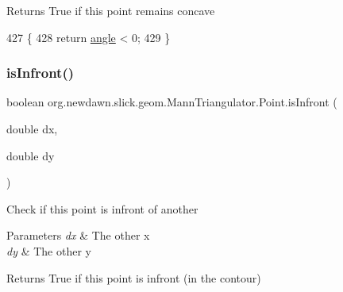 \begin{DoxyReturn}{Returns}
True if this point remains concave 
\end{DoxyReturn}

\begin{DoxyCode}
427                                    \{
428             \textcolor{keywordflow}{return} \mbox{\hyperlink{classorg_1_1newdawn_1_1slick_1_1geom_1_1_mann_triangulator_1_1_point_adbff3dca6beaef071adb22b814f0e7ae}{angle}} < 0;
429         \}
\end{DoxyCode}
\mbox{\label{classorg_1_1newdawn_1_1slick_1_1geom_1_1_mann_triangulator_1_1_point_a9b2abef9a42ad4116972c02fc47e7c24}} 
\subsubsection{\texorpdfstring{is\+Infront()}{isInfront()}\hspace{0.1cm}{\footnotesize\ttfamily [1/2]}}
{\footnotesize\ttfamily boolean org.\+newdawn.\+slick.\+geom.\+Mann\+Triangulator.\+Point.\+is\+Infront (\begin{DoxyParamCaption}\item[{double}]{dx,  }\item[{double}]{dy }\end{DoxyParamCaption})\hspace{0.3cm}{\ttfamily [inline]}}

Check if this point is infront of another


\begin{DoxyParams}{Parameters}
{\em dx} & The other x \\
\hline
{\em dy} & The other y \\
\hline
\end{DoxyParams}
\begin{DoxyReturn}{Returns}
True if this point is infront (in the contour) 
\end{DoxyReturn}

